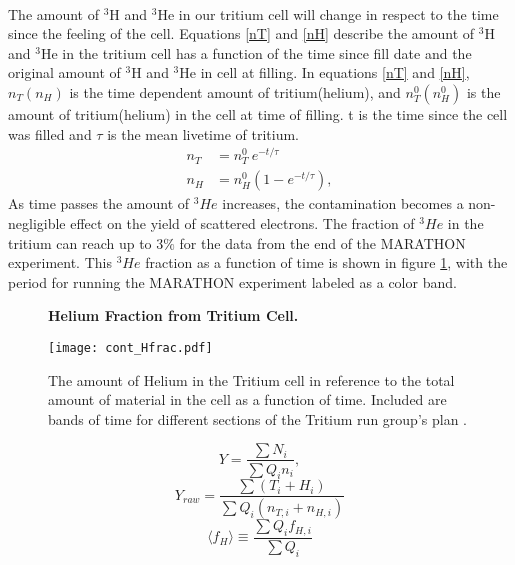 \paragraph{}The amount of $^3$H and $^3$He in our tritium cell will change in respect to the time since the feeling of the cell. Equations \ref{nT} and \ref{nH} describe the amount of $^3$H and $^3$He in the tritium cell has a function of the time since fill date and the original amount of $^3$H and $^3$He in cell at filling. In equations \ref{nT} and \ref{nH}, $n_T(n_H)$ is the time dependent amount of tritium(helium), and  $n_T^0(n_H^0)$ is the amount of tritium(helium) in the cell at time of filling. t is the time since the cell was filled and $\tau$ is the mean livetime of tritium.
\begin{align}
	n_T &= n_T^0 \: e^{-t/\tau} \label{nT}\\
	n_H &= n_H^0(1 - e^{-t/\tau}) \label{nH},
\end{align}
As time passes the amount of $^3He$ increases, the contamination becomes a non-negligible effect on the yield of scattered electrons. The fraction of $^3He$ in the tritium can reach up to 3$\%$ for the data from the end of the MARATHON experiment. This $^3He$ fraction as a function of time is shown in figure \ref{Hfract}, with the period for running the MARATHON experiment labeled as a color band. 

\begin{figure}[t]
	\centering
	\textbf{Helium Fraction from Tritium Cell. }\par\medskip
	\texttt{[image: cont\_Hfrac.pdf]}
	\caption{The amount of Helium in the Tritium cell in reference to the total amount of material in the cell as a function of time. Included are bands of time for different sections of the Tritium run group's plan \cite{Beta}.}
	\label{Hfract}
\end{figure}
\begin{equation}
Y = \frac{\sum N_i}{\sum Q_i n_i}, \label{yield} 
\end{equation}
\begin{equation}
Y_{raw} = \frac{\sum (T_i + H_i)}{\sum Q_i (n_{T,i} + n_{H,i})} \label{Yraw}
\end{equation}
\begin{equation}
\langle f_H \rangle \equiv \frac{\sum Q_i f_{H,i}}{\sum Q_i} \label{QwHf}
\end{equation}


